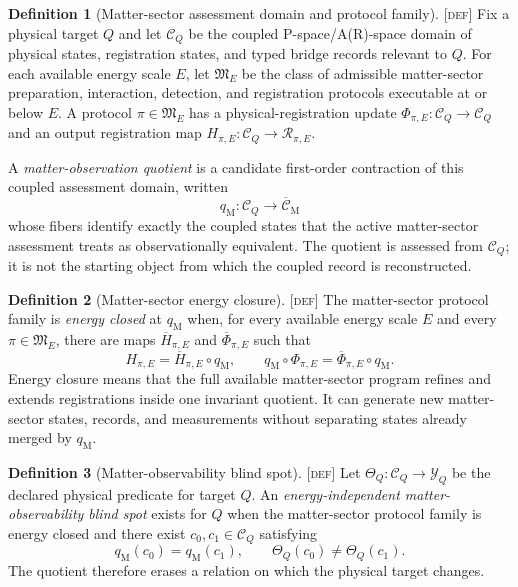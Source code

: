 \documentclass[11pt]{article}
\newcommand{\Defn}{\textsc{[def]}}
\theoremstyle{definition}
\newtheorem{sdefinition}{Definition}
\begin{document}
\begin{sdefinition}[Matter-sector assessment domain and protocol family]
\label{def:matter-domain}
\Defn{} Fix a physical target $Q$ and let $\mathcal C_Q$ be the coupled
P-space/A(R)-space domain of physical states, registration states, and typed bridge
records relevant to $Q$. For each available energy scale $E$, let
$\mathfrak M_E$ be the class of admissible matter-sector preparation, interaction,
detection, and registration protocols executable at or below $E$. A protocol
$\pi\in\mathfrak M_E$ has a physical-registration update
$\Phi_{\pi,E}:\mathcal C_Q\to\mathcal C_Q$ and an output registration map
$H_{\pi,E}:\mathcal C_Q\to\mathcal R_{\pi,E}$.

A \emph{matter-observation quotient} is a candidate first-order contraction of
this coupled assessment domain, written
\begin{equation}
q_{\mathrm M}:\mathcal C_Q\longrightarrow\overline{\mathcal C}_{\mathrm M}
\label{eq:matter-quotient-supp}
\end{equation}
whose fibers identify exactly the coupled states that the active matter-sector
assessment treats as observationally equivalent. The quotient is assessed from
$\mathcal C_Q$; it is not the starting object from which the coupled record is
reconstructed.
\end{sdefinition}

\begin{sdefinition}[Matter-sector energy closure]
\label{def:matter-energy-closure}
\Defn{} The matter-sector protocol family is \emph{energy closed} at
$q_{\mathrm M}$ when, for every available energy scale $E$ and every
$\pi\in\mathfrak M_E$, there are maps $\overline H_{\pi,E}$ and
$\overline\Phi_{\pi,E}$ such that
\begin{equation}
H_{\pi,E}=\overline H_{\pi,E}\circ q_{\mathrm M},
\qquad
q_{\mathrm M}\circ\Phi_{\pi,E}
=\overline\Phi_{\pi,E}\circ q_{\mathrm M}.
\label{eq:matter-energy-closure-supp}
\end{equation}
Energy closure means that the full available matter-sector program refines and
extends registrations inside one invariant quotient. It can generate new
matter-sector states, records, and measurements without separating states already
merged by $q_{\mathrm M}$.
\end{sdefinition}

\begin{sdefinition}[Matter-observability blind spot]
\label{def:matter-blindspot}
\Defn{} Let $\Theta_Q:\mathcal C_Q\to\mathcal Y_Q$ be the declared physical
predicate for target $Q$. An \emph{energy-independent matter-observability blind
spot} exists for $Q$ when the matter-sector protocol family is energy closed and
there exist $c_0,c_1\in\mathcal C_Q$ satisfying
\begin{equation}
q_{\mathrm M}(c_0)=q_{\mathrm M}(c_1),
\qquad
\Theta_Q(c_0)\neq\Theta_Q(c_1).
\label{eq:matter-target-nonfactor-supp}
\end{equation}
The quotient therefore erases a relation on which the physical target changes.
\end{sdefinition}
\end{document}
